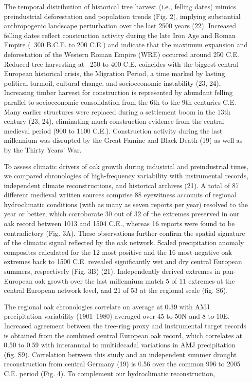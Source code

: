\documentclass[10pt,a4paper,twoside,onecolumn]{article}
\begin{document}
\begin{myfont}
\begin{multicols}{3}
The temporal distribution of historical tree harvest (i.e., felling dates) mimics preindustrial deforestation and population trends (Fig. 2),
implying substantial anthropogenic landscape perturbation over the last 2500 years (22). Increased felling dates reflect construction activity
during the late Iron Age and Roman Empire (~300 B.C.E. to 200 C.E.) and indicate that the maximum expansion and deforestation of the
Western Roman Empire (WRE) occurred around 250 C.E. Reduced tree harvesting at ~250 to 400 C.E. coincides with the biggest central European
historical crisis, the Migration Period, a time marked by lasting political turmoil, cultural change, and socioeconomic instability (23, 24).
Increasing timber harvest for construction is represented by abundant felling parallel to socioeconomic consolidation from the 6th to the 9th
centuries C.E. Many earlier structures were replaced during a settlement boom in the 13th century (23, 24), eliminating much construction
evidence from the central medieval period (900 to 1100 C.E.). Construction activity during the last millennium was disrupted by the Great Famine
and Black Death (19) as well as by the Thirty Years’ War. \par
To assess climatic drivers of oak growth during industrial and preindustrial times, we compared chronologies of high-frequency variability
with instrumental records, independent climate reconstructions, and historical archives (21). A total of 87 different medieval written sources
comprise 88 eyewitness accounts of regional hydroclimatic conditions (with as many as seven reports per year) resolved to the year or better,
which corroborate 30 out of 32 of the extremes preserved in our oak record between 1013 and 1504 C.E., whereas 16 reports were found to be
contradictory (Fig. 3A). These observations further confirm the spatial signature of the climatic signal reflected by the oak network. Scaled precipitation
anomaly composites calculated for the 12 most positive and the 16 most negative oak extremes back to 1500 C.E. revealed significantly
wet and dry central European summers, respectively (Fig. 3B) (21). Independently derived extremes in pan-European oak growth over the
last millennium match 5 of 11 extremes at the central European network level, and 21 of 53 at the regional scale (fig. S6). \par
The regional oak chronologies correlate on average at 0.39 with AMJ precipitation variability (1901–1980) averaged over 45 to 50N and 8 to 10E. Increased agreement between the tree-ring proxy and instrumental target records is obtained from the combined central European oak record, which correlates at 0.50 to 0.59 with interannual to multidecadal variations in AMJ precipitation (fig. S9). Correlation between this study and an independent summer drought reconstruction from central Germany (19) is 0.56 over the common 996 to 2005 C.E. period (Fig. 4). To complement our hydroclimatic reconstruction,

\end{multicols}
\end{myfont}
\end{document}

